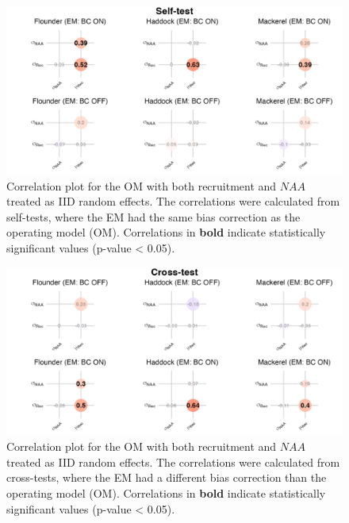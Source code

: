 \documentclass[
  12pt,
]{article}
\begin{document}
\begin{figure}[H]
    \centering
    \includegraphics[width=\textwidth]{Original_Figures&Tables/Correlation_plot_NAA_iid.PNG}
    \caption{Correlation plot for the OM with both recruitment and $NAA$ treated as IID random effects. The correlations were calculated from self-tests, where the EM had the same bias correction as the operating model (OM). Correlations in \textbf{bold} indicate statistically significant values (p-value < 0.05).}
    \label{fig:supp_Cor_NAA_iid}
\end{figure}

\begin{figure}[H]
    \centering
    \includegraphics[width=\textwidth]{Original_Figures&Tables/Correlation_plot_NAA_iid_mismatch.PNG}
    \caption{Correlation plot for the OM with both recruitment and $NAA$ treated as IID random effects. The correlations were calculated from cross-tests, where the EM had a different bias correction than the operating model (OM). Correlations in \textbf{bold} indicate statistically significant values (p-value < 0.05).}
    \label{fig:supp_Cor_NAA_iid_mis}
\end{figure}
\end{document}
